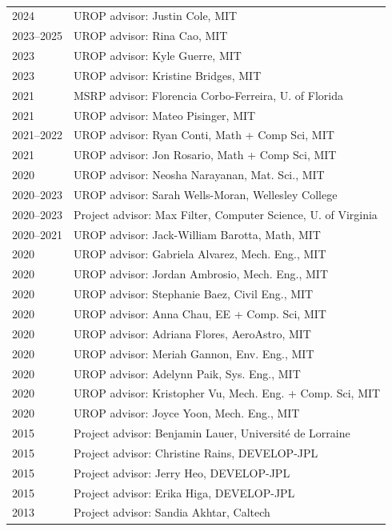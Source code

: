 \documentclass[11pt, oneside]{article}
\newcommand{\cvsubsection}[1]{%
  \vspace{2mm}%
  \noindent{\sffamily\color{DeepTeal}#1}%
  \vspace{2mm}\par%
}
\newenvironment{changemargin}[2]{%
  \list{}{\rightmargin#2\leftmargin#1
  \parsep=0pt\topsep=0pt\partopsep=0pt}
  \item[]}
  {\endlist}
\newenvironment{indentmore}{\begin{changemargin}{4mm}{0cm}}{\end{changemargin}}
\begin{document}
\begin{indentmore}
\vspace{-3mm}
\cvsubsection{Undergraduate students}\\
\vspace{-5mm}
\begin{longtable}[h]{l p{13cm}}
2024\hphantom{--2024} & UROP advisor: Justin Cole, MIT \\
2023--2025 & UROP advisor: Rina Cao, MIT \\
2023\hphantom{--2023} & UROP advisor: Kyle Guerre, MIT \\
2023\hphantom{--2023} & UROP advisor: Kristine Bridges, MIT \\
2021\hphantom{--2021} & MSRP advisor: Florencia Corbo-Ferreira, U. of Florida \\
2021\hphantom{--2021} & UROP advisor: Mateo Pisinger, MIT \\
2021--2022 & UROP advisor: Ryan Conti, Math + Comp Sci, MIT \\
2021\hphantom{--2021} & UROP advisor: Jon Rosario, Math + Comp Sci, MIT \\
2020\hphantom{--2020} & UROP advisor: Neosha Narayanan, Mat. Sci., MIT \\
2020--2023 & UROP advisor: Sarah Wells-Moran, Wellesley College \\
2020--2023 & Project advisor: Max Filter, Computer Science, U. of Virginia \\
2020--2021 & UROP advisor: Jack-William Barotta, Math, MIT \\
2020\hphantom{--2020} & UROP advisor: Gabriela Alvarez, Mech. Eng., MIT \\
2020\hphantom{--2020} & UROP advisor: Jordan Ambrosio, Mech. Eng., MIT \\
2020\hphantom{--2020} & UROP advisor: Stephanie Baez, Civil Eng., MIT \\
2020\hphantom{--2020} & UROP advisor: Anna Chau, EE + Comp. Sci, MIT \\
2020\hphantom{--2020} & UROP advisor: Adriana Flores, AeroAstro, MIT \\
2020\hphantom{--2020} & UROP advisor: Meriah Gannon, Env. Eng., MIT \\
2020\hphantom{--2020} & UROP advisor: Adelynn Paik, Sys. Eng., MIT \\
2020\hphantom{--2020} & UROP advisor: Kristopher Vu, Mech. Eng. + Comp. Sci, MIT \\
2020\hphantom{--2020} & UROP advisor: Joyce Yoon, Mech. Eng., MIT \\
2015\hphantom{--2015} & Project advisor: Benjamin Lauer, Universit\'{e} de Lorraine \\
2015\hphantom{--2015} & Project advisor: Christine Rains, DEVELOP-JPL \\
2015\hphantom{--2015} & Project advisor: Jerry Heo, DEVELOP-JPL \\
2015\hphantom{--2015} & Project advisor: Erika Higa, DEVELOP-JPL \\
2013\hphantom{--2013} & Project advisor: Sandia Akhtar, Caltech
\end{longtable}

\endgroup
\end{indentmore}
\end{document}
